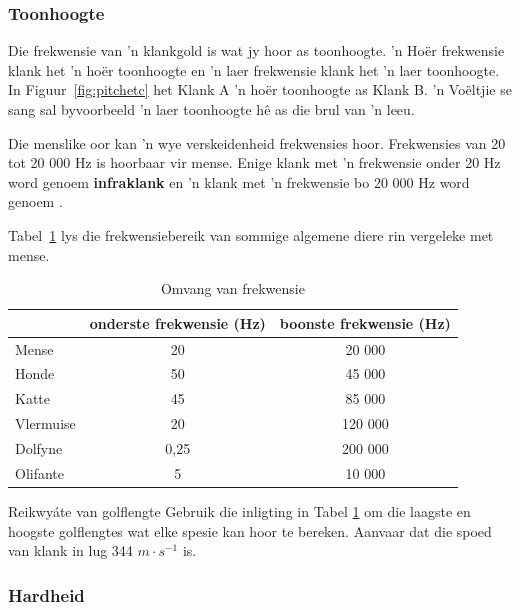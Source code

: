             \subsubsection{Toonhoogte}
            \nopagebreak
            
Die frekwensie van 'n klankgold is wat jy hoor as toonhoogte. 'n Ho\"er frekwensie klank het 'n ho\"er toonhoogte en 'n laer frekwensie klank het 'n laer toonhoogte. In Figuur~\ref{fig:pitchetc} het Klank A 'n ho\"er toonhoogte as Klank B. 'n Vo\"eltjie se sang sal byvoorbeeld 'n laer toonhoogte h\^e as die brul van 'n leeu.\par

Die menslike oor kan 'n wye verskeidenheid frekwensies hoor. Frekwensies van 20 tot 20 000 Hz is hoorbaar vir mense. Enige klank met 'n frekwensie onder 20 Hz word genoem \textbf{infraklank} en 'n klank met 'n frekwensie bo 20 000 Hz word genoem .\par


Tabel~\ref{p:wsl:s11:rangeoff} lys die frekwensiebereik van sommige algemene diere rin vergeleke met mense.

\begin{table}[htbp]
\begin{center}
\caption{Omvang van frekwensie}
\label{p:wsl:s11:rangeoff}
\begin{tabular}{|l|c|c|}\hline
&onderste frekwensie (Hz) & boonste frekwensie (Hz)\\\hline\hline
Mense & 20 & 20 000\\\hline
Honde & 50 & 45 000\\\hline
Katte & 45 & 85 000\\\hline
Vlermuise & 20 & 120 000\\\hline
Dolfyne & 0,25 & 200 000\\\hline
Olifante & 5 & 10 000\\\hline
\hline
\end{tabular}
\end{center}
\end{table}
    \par
\begin{activity}{Reikwy\'ate van golflengte}
\nopagebreak
Gebruik die inligting in Tabel \ref{p:wsl:s11:rangeoff} om die laagste en hoogste golflengtes wat elke spesie kan hoor te bereken. Aanvaar dat die spoed van klank in lug 344 $m \cdot s^{-1}$ is.
\end{activity}
 
\subsubsection{Hardheid}
\nopagebreak

